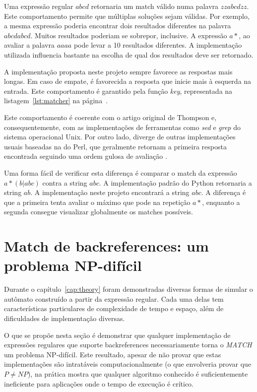 \documentclass[a4paper,12pt,oneside,onecolumn]{uerj}
\begin{document}
Uma expressão regular $abcd$ retornaria um match válido numa palavra $zzabcdzz$. Este comportamento permite que múltiplas soluções sejam válidas. Por exemplo, a mesma expressão poderia encontrar dois resultados diferentes na palavra $abcdabcd$. Muitos resultados poderiam se sobrepor, inclusive. A expressão $a*$, ao avaliar a palavra $aaaa$ pode levar a 10 resultados diferentes. A implementação utilizada influencia bastante na escolha de qual dos resultados deve ser retornado.

A implementação proposta neste projeto sempre favorece as respostas mais longas. Em caso de empate, é favorecida a resposta que inicie mais à esquerda na entrada. Este comportamento é garantido pela função \emph{key}, representada na listagem~\ref{lst:matcher} na página~\pageref{lst:matcher}.

Este comportamento é coerente com o artigo original de Thompson e, consequentemente, com as implementações de ferramentas como \emph{sed} e \emph{grep} do sistema operacional Unix. Por outro lado, diverge de outras implementações usuais baseadas na do Perl, que geralmente retornam a primeira resposta encontrada seguindo uma ordem gulosa de avaliação \cite{bib:Cox07}.

Uma forma fácil de verificar esta diferença é comparar o match da expressão $a*(b|abc)$ contra a string $abc$. A implementação padrão do Python retornaria a string $ab$. A implementação neste projeto encontrará a string $abc$. A diferença é que a primeira tenta avaliar o máximo que pode na repetição $a*$, enquanto a segunda consegue visualizar globalmente os matches possíveis.

\section{Match de backreferences: um problema NP-difícil}

Durante o capítulo~\ref{cap:theory} foram demonstradas diversas formas de simular o autômato construído a partir da expressão regular. Cada uma delas tem características particulares de complexidade de tempo e espaço, além de dificuldades de implementação diversas.

O que se propõe nesta seção é demonstrar que qualquer implementação de expressões regulares que suporte backreferences necessariamente torna o \emph{MATCH} um problema NP-difícil. Este resultado, apesar de não provar que estas implementações são intratáveis computacionalmente (o que envolveria provar que $P \neq NP$), na prática mostra que qualquer algoritmo conhecido é suficientemente ineficiente para aplicações onde o tempo de execução é crítico.
\end{document}
